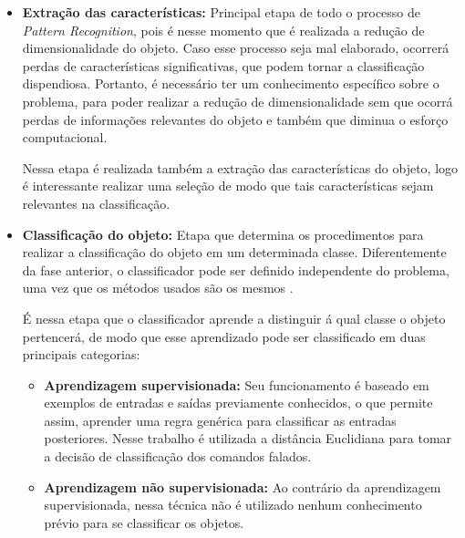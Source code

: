 \documentclass[a4paper,12pt,twoside,openright]{report}
\begin{document}
\begin{itemize}
	
	\item{
		\textbf{Extra{\c c}\~{a}o das caracter\'{i}sticas:} Principal etapa de todo o processo de \textit{Pattern Recognition}, pois \'{e} nesse momento que \'{e} realizada a redu{\c c}\~{a}o de dimensionalidade do objeto. Caso esse processo seja mal elaborado, ocorrer\'{a} perdas de caracter\'{i}sticas significativas, que podem tornar a classifica{\c c}\~{a}o dispendiosa. Portanto, \'{e} necess\'{a}rio ter um conhecimento espec\'{i}fico sobre o problema, para poder realizar a redu{\c c}\~{a}o de dimensionalidade sem que ocorr\'{a} perdas de informa{\c c}\~{o}es relevantes do objeto e tamb\'{e}m que diminua o esfor{\c c}o computacional. 
		\par Nessa etapa \'{e} realizada tamb\'{e}m a extra{\c c}\~{a}o das caracter\'{i}sticas do objeto, logo \'{e} interessante realizar uma sele{\c c}\~{a}o de modo que tais caracter\'{i}sticas sejam relevantes na classifica{\c c}\~{a}o.
	}		 
	
	\item{
		\textbf{Classifica{\c c}\~{a}o do objeto:} Etapa que determina os procedimentos para realizar a classifica{\c c}\~{a}o do objeto em um determinada classe. Diferentemente da fase anterior, o classificador pode ser definido independente do problema, uma vez que os m\'{e}todos usados s\~{a}o os mesmos .
		\par\'{E} nessa etapa que o classificador aprende a distinguir \'{a} qual classe o objeto pertencer\'{a}, de modo que esse aprendizado pode ser classificado em duas principais categorias:
		
		\begin{itemize}
			\item \textbf{Aprendizagem supervisionada:} Seu funcionamento \'{e} baseado em exemplos de entradas e sa\'{i}das previamente conhecidos, o que permite assim, aprender uma regra gen\'{e}rica para classificar as entradas posteriores. Nesse trabalho \'{e} utilizada a dist\^{a}ncia Euclidiana para tomar a decis\~{a}o de classifica{\c c}\~{a}o dos comandos falados.
			\item \textbf{Aprendizagem n\~{a}o supervisionada:} Ao contr\'{a}rio da aprendizagem supervisionada, nessa t\'{e}cnica n\~{a}o \'{e} utilizado nenhum conhecimento pr\'{e}vio para se classificar os objetos.
		\end{itemize}
}	
\end{itemize}
\end{document}
